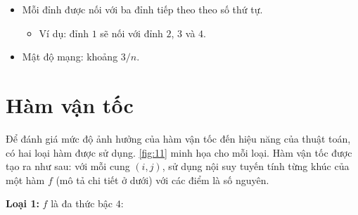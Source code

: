 \documentclass[../main.tex]{subfiles}
\begin{document}
  \begin{itemize}
    \tightlist
    \item
      Mỗi đỉnh được nối với ba đỉnh tiếp theo theo số thứ tự.
    
      \begin{itemize}
      \tightlist
      \item
        Ví dụ: đỉnh $1$ sẽ nối với đỉnh $2$, $3$ và $4$.
      \end{itemize}
    \item
      Mật độ mạng: khoảng \(3/n\).
    \end{itemize}













\section{Hàm vận tốc}\label{huxe0m-thux1eddi-gian}

Để đánh giá mức độ ảnh hưởng của hàm vận tốc đến hiệu năng
của thuật toán, có hai loại hàm được sử dụng. \autoref{fig:11} minh họa cho mỗi
loại. Hàm vận tốc được tạo ra như sau: với mỗi cung
\((i,j)\), sử dụng nội suy tuyến tính từng khúc của một hàm \(f\) (mô tả
chi tiết ở dưới) với các điểm là số nguyên.

\textbf{Loại 1:} \(f\) là đa thức bậc $4$:
\end{document}
